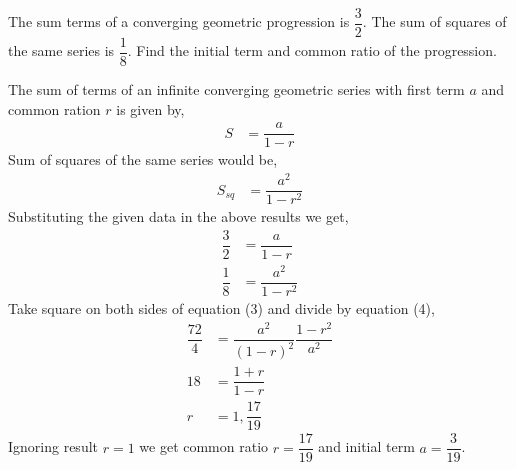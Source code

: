 

\question[4] The sum terms of a converging geometric progression is $\dfrac{3}{2}$. The sum of squares of the same series is $\dfrac{1}{8}$. Find the initial term and common ratio of the progression.


\ifprintanswers
\fi 

\begin{solution}[\fullpage]
  The sum of terms of an infinite converging geometric series with first term $a$ and common ration $r$ is given by,
  \begin{align}
    S &= \dfrac{a}{1-r}
  \end{align}
  Sum of squares of the same series would be,
  \begin{align}
    S_{sq} &= \dfrac{a^2}{1-r^2}
  \end{align}
  Substituting the given data in the above results we get,
  \begin{align}
    \dfrac{3}{2} &= \dfrac{a}{1-r} \\
    \dfrac{1}{8} &= \dfrac{a^2}{1-r^2}
  \end{align}  
  Take square on both sides of equation (3) and divide by equation (4),
  \begin{align}
    \dfrac{72}{4} &= \dfrac{a^2}{(1-r)^2}\dfrac{1-r^2}{a^2} \\
    18            &= \dfrac{1+r}{1-r} \\
    r             &=1,\dfrac{17}{19}
  \end{align}
  Ignoring result $r=1$ we get common ratio $r=\dfrac{17}{19}$ and initial term $a=\dfrac{3}{19}$.

\end{solution}

